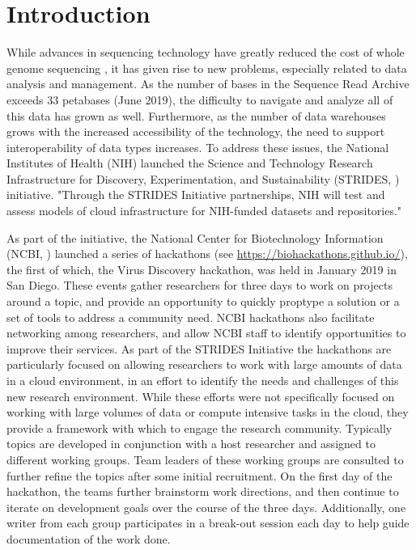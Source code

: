 \section{Introduction}
  While advances in sequencing technology have greatly reduced the cost of
  whole genome sequencing \cite{Mardis2011}, it has given rise to new problems,
  especially related to data analysis and management. As the number of bases in
  the Sequence Read Archive \cite{Kodama2012} exceeds 33 petabases (June 2019),
  the difficulty to navigate and analyze all of this data has grown as well.
  Furthermore, as the number of data warehouses grows with the increased
  accessibility of the technology, the need to support interoperability of data
  types increases. To address these issues, the National Institutes of Health
  (NIH) launched the Science and Technology Research Infrastructure for
  Discovery, Experimentation, and Sustainability (STRIDES, \cite{StridesWeb})
  initiative. "Through the STRIDES Initiative partnerships, NIH will test and
  assess models of cloud infrastructure for NIH-funded datasets and
  repositories."

  As part of the initiative, the National Center for Biotechnology Information
  (NCBI, \cite{Sayers2019}) launched a series of hackathons (see
  \url{https://biohackathons.github.io/}), the first of which, the Virus Discovery
  hackathon, was held in January 2019 in San Diego. These events gather
  researchers for three days to work on projects around a topic, and provide an
  opportunity to quickly proptype a solution or a set of tools to address a
  community need. NCBI hackathons also facilitate networking among researchers,
  and allow NCBI staff to identify opportunities to improve their services. As
  part of the STRIDES Initiative the hackathons are particularly focused on
  allowing researchers to work with large amounts of data in a cloud
  environment, in an effort to identify the needs and challenges of this new
  research environment. While these efforts were not specifically focused on
  working with large volumes of data or compute intensive tasks in the cloud,
  they provide a framework with which to engage the research community.
  Typically topics are developed in conjunction with a host researcher and
  assigned to different working groups. Team leaders of these working groups
  are consulted to further refine the topics after some initial recruitment. On
  the first day of the hackathon, the teams further brainstorm work directions,
  and then continue to iterate on development goals over the course of the
  three days. Additionally, one writer from each group participates in a
  break-out session each day to help guide documentation of the work done.

